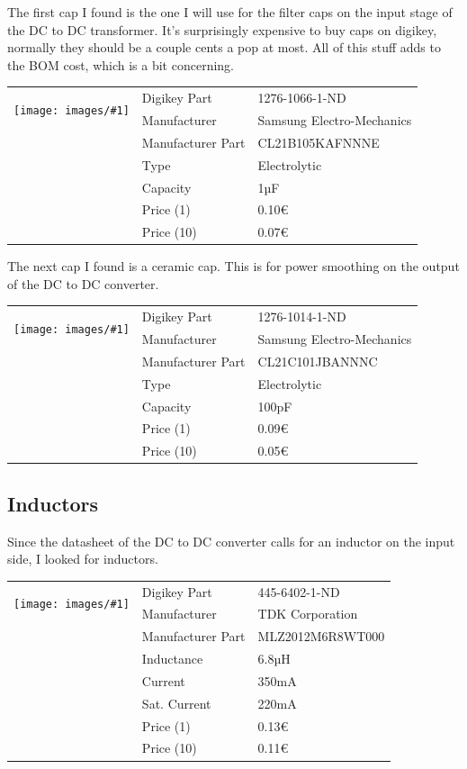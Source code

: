 \documentclass[a4paper]{article}
\makeatletter
\newenvironment{partdisplay}[1]{
\begin{center}
\begin{tabular}{@{}p{3cm}p{3cm}p{4.5cm}@{}}
\multirow{2}{3cm}{\texttt{[image: images/\#1]}}}{
\end{tabular}
\end{center}}
\makeatother
\begin{document}
The first cap I found is the one I will use for the filter caps on the input stage of the DC to DC transformer. It's surprisingly expensive to buy caps on digikey, normally they should be a couple cents a pop at most. All of this stuff adds to the BOM cost, which is a bit concerning.

\begin{partdisplay}{samsung8050}
& Digikey Part & 1276-1066-1-ND\\
& Manufacturer & Samsung Electro-Mechanics\\
& Manufacturer Part & CL21B105KAFNNNE\\
& Type & Electrolytic\\
& Capacity & 1µF\\
& Price (1) & 0.10€\\
& Price (10) & 0.07€\\  
\end{partdisplay}

The next cap I found is a ceramic cap. This is for power smoothing on the output of the DC to DC converter.

\begin{partdisplay}{samsung8050}
& Digikey Part & 1276-1014-1-ND\\
& Manufacturer & Samsung Electro-Mechanics\\
& Manufacturer Part & CL21C101JBANNNC\\
& Type & Electrolytic\\
& Capacity & 100pF\\
& Price (1) & 0.09€\\
& Price (10) & 0.05€\\  
\end{partdisplay}

\subsection{Inductors}

Since the datasheet of the DC to DC converter calls for an inductor on the input side, I looked for inductors. 

\begin{partdisplay}{MFG_MLZ2012}
& Digikey Part & 445-6402-1-ND\\
& Manufacturer & TDK Corporation\\
& Manufacturer Part & MLZ2012M6R8WT000\\
& Inductance & 6.8µH\\
& Current & 350mA\\
& Sat. Current & 220mA\\
& Price (1) & 0.13€\\
& Price (10) & 0.11€\\
\end{partdisplay}
\end{document}
